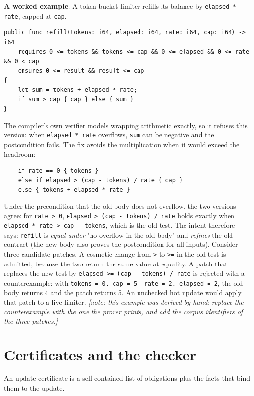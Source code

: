 \documentclass[10pt,twocolumn]{article}
\newcommand{\authornote}[1]{{\color{gray}\textit{[note: #1]}}}
\begin{document}
\textbf{A worked example.} A token-bucket limiter refills its balance by \texttt{elapsed * rate}, capped at \texttt{cap}.

\begin{small}\begin{verbatim}
public func refill(tokens: i64, elapsed: i64, rate: i64, cap: i64) -> i64
    requires 0 <= tokens && tokens <= cap && 0 <= elapsed && 0 <= rate && 0 < cap
    ensures 0 <= result && result <= cap
{
    let sum = tokens + elapsed * rate;
    if sum > cap { cap } else { sum }
}
\end{verbatim}\end{small}
The compiler's own verifier models wrapping arithmetic exactly, so it refuses this version: when \texttt{elapsed * rate} overflows, \texttt{sum} can be negative and the postcondition fails. The fix avoids the multiplication when it would exceed the headroom:

\begin{small}\begin{verbatim}
    if rate == 0 { tokens }
    else if elapsed > (cap - tokens) / rate { cap }
    else { tokens + elapsed * rate }
\end{verbatim}\end{small}
Under the precondition that the old body does not overflow, the two versions agree: for \texttt{rate \textgreater{} 0}, \texttt{elapsed \textgreater{} (cap - tokens) / rate} holds exactly when \texttt{elapsed * rate \textgreater{} cap - tokens}, which is the old test. The intent therefore says: \texttt{refill} is \emph{equal under} "no overflow in the old body" and \emph{refines} the old contract (the new body also proves the postcondition for all inputs). Consider three candidate patches. A cosmetic change from \texttt{\textgreater{}} to \texttt{\textgreater{}=} in the old test is admitted, because the two return the same value at equality. A patch that replaces the new test by \texttt{elapsed \textgreater{}= (cap - tokens) / rate} is rejected with a counterexample: with \texttt{tokens = 0, cap = 5, rate = 2, elapsed = 2}, the old body returns 4 and the patch returns 5. An unchecked hot update would apply that patch to a live limiter. \authornote{this example was derived by hand; replace the counterexample with the one the prover prints, and add the corpus identifiers of the three patches.}

\section{Certificates and the checker}\label{sec-cert}
An update certificate is a self-contained list of obligations plus the facts that bind them to the update.
\end{document}
